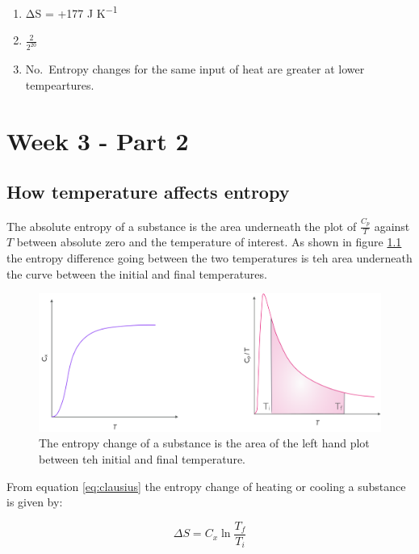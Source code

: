 \documentclass[
]{book}
\begin{document}
\begin{enumerate}
\def\labelenumi{\arabic{enumi}.}
\item
  ΔS = +177 J K\textsuperscript{−1}
\item
  \(\frac{2}{2^{20}}\)
\item
  No.~Entropy changes for the same input of heat are greater at lower tempeartures.
\end{enumerate}

\hypertarget{ch:Part6}{%
\chapter{Week 3 - Part 2}\label{ch:Part6}}

\hypertarget{how-temperature-affects-entropy}{%
\section{How temperature affects entropy}\label{how-temperature-affects-entropy}}

The absolute entropy of a substance is the area underneath the plot of \(\frac{C_p}{T}\) against \(T\) between absolute zero and the temperature of interest. As shown in figure \ref{fig:entropytemp} the entropy difference going between the two temperatures is teh area underneath the curve between the initial and final temperatures.

\begin{figure}

{\centering \includegraphics[width=0.8\linewidth]{images/entropytemp} 

}

\caption{The entropy change of a substance is the area of the left hand plot between teh initial and final temperature.}\label{fig:entropytemp}
\end{figure}

From equation \eqref{eq:clausius} the entropy change of heating or cooling a substance is given by:

\begin{equation}
\Delta S=C_x \ln \frac{T_f}{T_i}
\label{eq:entropytemp}
\end{equation}
\end{document}
